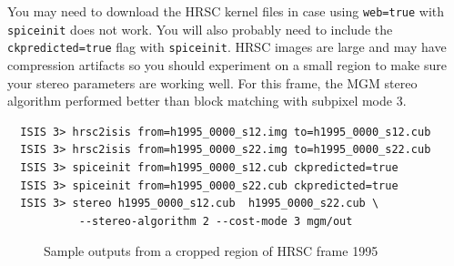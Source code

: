 You may need to download the HRSC kernel files in case using \texttt{web=true} with
\texttt{spiceinit} does not work.  You will also probably need to include the 
\texttt{ckpredicted=true} flag with \texttt{spiceinit}.  HRSC images are large
and may have compression artifacts so you should experiment on a small region
to make sure your stereo parameters are working well.  For this frame, the MGM
stereo algorithm performed better than block matching with subpixel mode 3.

\begin{verbatim}
  ISIS 3> hrsc2isis from=h1995_0000_s12.img to=h1995_0000_s12.cub
  ISIS 3> hrsc2isis from=h1995_0000_s22.img to=h1995_0000_s22.cub
  ISIS 3> spiceinit from=h1995_0000_s12.cub ckpredicted=true
  ISIS 3> spiceinit from=h1995_0000_s22.cub ckpredicted=true
  ISIS 3> stereo h1995_0000_s12.cub  h1995_0000_s22.cub \
           --stereo-algorithm 2 --cost-mode 3 mgm/out
\end{verbatim}

\begin{figure}[h!]
\centering
  \hfil
  \hfil
\caption{Sample outputs from a cropped region of HRSC frame 1995}
\label{fig:hrsc_example}
\end{figure}



